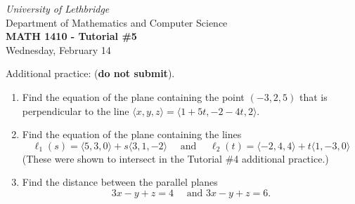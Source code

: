 \documentclass[12pt]{article}
\newcommand{\skipline}{\vspace{12pt}}
\begin{document}
\author{Instructor: Sean Fitzpatrick}
\thispagestyle{empty}
\begin{center}
\emph{University of Lethbridge}\\
Department of Mathematics and Computer Science\\
{\bf MATH 1410 - Tutorial \#5}\\
Wednesday, February 14
\end{center}
\skipline \skipline \skipline \noindent \skipline

\vspace*{\fill}




\bigskip

Additional practice: (\textbf{do not submit}).
\begin{enumerate}
\item Find the equation of the plane containing the point $(-3,2,5)$ that is perpendicular to the line $\langle x,y,z\rangle = \langle 1+5t,-2-4t,2\rangle$.

\item Find the equation of the plane containing the lines 
\[
\ell_1(s)  = \langle 5,3,0\rangle + s\langle 3,1,-2\rangle\quad\text{ and } \quad
\ell_2(t)  = \langle -2,4,4\rangle+t\langle 1,-3,0\rangle
\]
(These were shown to intersect in the Tutorial \#4 additional practice.)
\item Find the distance between the parallel planes
\[
3x-y+z=4 \quad \text{ and } 3x-y+z=6.
\]

\end{enumerate}


\newpage
\end{document}
